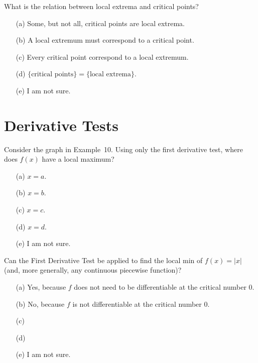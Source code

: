 \documentclass[14pt]{beamer}
\begin{document}
\begin{frame}[t]
  What is the relation between local extrema and critical points?

  \medskip
  \begin{itemize} \setlength\itemsep{1ex}
    \item[(a)] Some, but not all, critical points are local extrema.
    \item[(b)] A local extremum must correspond to a critical point.
    \item[(c)] Every critical point correspond to a local extremum.
    \item[(d)] \(\{ \text{critical points} \} = \{ \text{local extrema} \}\).
    \item[(e)] I am not sure.
  \end{itemize} 
\end{frame}

\section{Derivative Tests}

\begin{frame}[t]
  Consider the graph in Example~10. Using only the first derivative test, where does \(f(x)\) have a local maximum? 

  \medskip
  \begin{itemize} \setlength\itemsep{1ex}
    \item[(a)] \(x = a\). 
    \item[(b)] \(x = b\). 
    \item[(c)] \(x = c\).
    \item[(d)] \(x = d\). 
    \item[(e)] I am not sure.
  \end{itemize} 
\end{frame}

\begin{frame}[t]
  Can the First Derivative Test be applied to find the local min of \(f(x) = |x|\) (and, more generally, any continuous piecewise function)? 

  \medskip
  \begin{itemize} \setlength\itemsep{1ex}
    \item[(a)] Yes, because \(f\) does not need to be differentiable at the critical number \(0\).
    \item[(b)] No, because \(f\) is not differentiable at the critical number \(0\).
    \item[(c)] 
    \item[(d)] 
    \item[(e)] I am not sure.
  \end{itemize} 
\end{frame}
\end{document}
